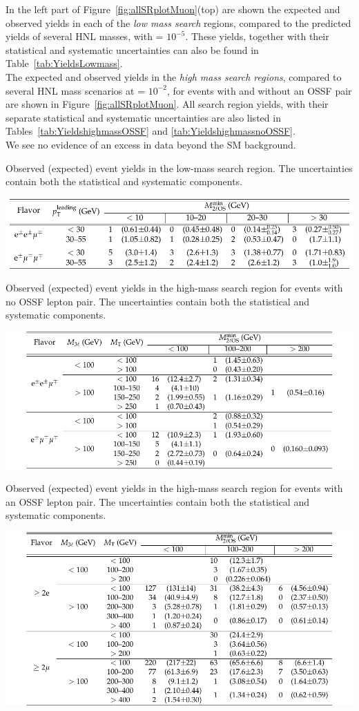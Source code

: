 In the left part of Figure~\ref{fig:allSRplotMuon}(top) are shown 
the expected and observed yields in each of the \emph{low mass search}
regions, compared to the predicted yields of several HNL masses, with \mixpar = $10^{-5}$. These yields, together with their
statistical and systematic uncertainties can also be found in
Table~\ref{tab:YieldsLowmass}.  \\
The expected and observed yields in the \emph{high mass search regions},
compared to several HNL mass scenarios at \mixpar = $10^{-2}$, for
events with and without an OSSF pair are shown in
Figure~\ref{fig:allSRplotMuon}. All search region yields, with their
separate statistical and systematic uncertainties are also listed in
Tables~\ref{tab:YieldshighmassOSSF} and
\ref{tab:YieldshighmassnoOSSF}. \\
We see no evidence of an excess in data beyond the SM background.
\small{
\begin{table}[h]
\centering
\caption{Observed (expected) event yields in the low-mass search region. The uncertainties
contain both the statistical and systematic components. \willem}
\label{tab:YieldsLowmass}
\includegraphics[width=0.65\linewidth]{Figures/c5/tables/CMS-EXO-17-012_Table_0A1.pdf}
\end{table}
\begin{table}[h]
\centering
\caption{Observed (expected) event yields in the high-mass search region for events with no
OSSF lepton pair. The uncertainties contain both the statistical and systematic components. \willem}
\label{tab:YieldshighmassOSSF}
\includegraphics[width=0.7\linewidth]{Figures/c5/tables/CMS-EXO-17-012_Table_0A2.pdf}
\end{table}
\begin{table}[h]
\centering
\caption{Observed (expected) event yields in the high-mass search region for events with an
OSSF lepton pair. The uncertainties contain both the statistical and systematic components. \willem}
\label{tab:YieldshighmassnoOSSF}
\includegraphics[width=0.7\linewidth]{Figures/c5/tables/CMS-EXO-17-012_Table_0A3.pdf}
\end{table}
}
